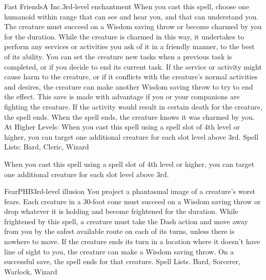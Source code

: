 \begin{spell}{Fast Friends}{A Inc.}{3rd-level enchantment}
{
}
When you cast this spell, choose one humanoid within range that can see and hear you, and that can understand you. The creature must succeed on a Wisdom saving throw or become charmed by you for the duration. While the creature is charmed in this way, it undertakes to perform any services or activities you ask of it in a friendly manner, to the best of its ability.
You can set the creature new tasks when a previous task is completed, or if you decide to end its current task. If the service or activity might cause harm to the creature, or if it conflicts with the creature's normal activities and desires, the creature can make another Wisdom saving throw to try to end the effect. This save is made with advantage if you or your companions are fighting the creature. If the activity would result in certain death for the creature, the spell ends.
When the spell ends, the creature knows it was charmed by you.
At Higher Levels: When you cast this spell using a spell slot of 4th level or higher, you can target one additional creature for each slot level above 3rd.
Spell Lists: Bard, Cleric, Wizard

 When you cast this spell using a spell slot of 4th level or higher, you can target one additional creature for each slot level above 3rd.
\end{spell}

\begin{spell}{Fear}{PHB}{3rd-level illusion}
{
}
You project a phantasmal image of a creature’s worst fears. Each creature in a 30-foot cone must succeed on a Wisdom saving throw or drop whatever it is holding and become frightened for the duration.
While frightened by this spell, a creature must take the Dash action and move away from you by the safest available route on each of its turns, unless there is nowhere to move. If the creature ends its turn in a location where it doesn’t have line of sight to you, the creature can make a Wisdom saving throw. On a successful save, the spell ends for that creature.
Spell Lists. Bard, Sorcerer, Warlock, Wizard
\end{spell}

